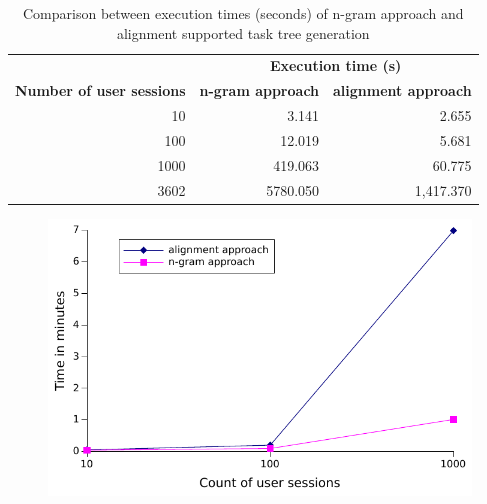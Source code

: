 \begin{table}[h]
	\centering
	\begin{tabular}{ r r r }
		\toprule
		& \multicolumn{2}{c}{\textbf{Execution time (s)}} \\
		\cmidrule{2-3}
		\textbf{Number of user sessions} & \textbf{n-gram approach} & \textbf{alignment approach} \\
		\midrule
		10 	& 3.141 		& 2.655 \\
		100 	& 12.019 	& 5.681 \\
		1000 	& 419.063 	& 60.775 \\
		\midrule
		3602 	& 5780.050 	& 1,417.370 \\
		\bottomrule
	\end{tabular}
	\caption{Comparison between execution times (seconds) of n-gram approach and alignment supported task tree generation}
	\label{tab:comparisontasktreegenerations}
\end{table}

%

 \begin{figure}[h]
	\includegraphics{chapters/casestudy/performance.pdf}
\end{figure}
